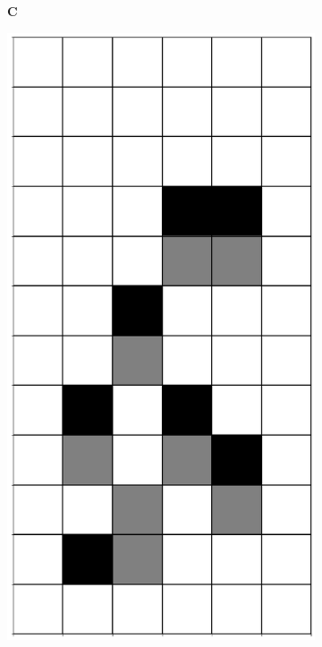 \documentclass[12pt]{article}
\numberwithin{figure}{section} %
\begin{document}
\begin{figure}[H]
     	\begin{subfigure}[t]{0.03\textwidth}
    		\textbf{C}
  	\end{subfigure}	
      	\begin{subfigure}{0.3\textwidth}
    		\centering
     		\includegraphics[angle=270,width=\linewidth]{Section4/5.0}

\end{subfigure}
\end{figure}
\end{document}
